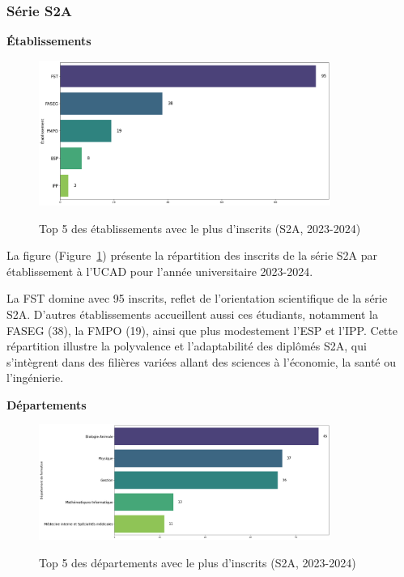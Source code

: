 
\subsubsection{Série S2A}

\textbf{Établissements}

\begin{figure}[ht]
\centering
\caption{Top 5 des établissements avec le plus d'inscrits (S2A, 2023-2024)}
\includegraphics[width=0.85\textwidth]{figure/etab_S2A_2024.png}
\label{fig:etab_s2a_2024}
\end{figure}

La figure (Figure~\ref{fig:etab_s2a_2024}) présente la répartition des inscrits de la série S2A par établissement à l'UCAD pour l'année universitaire 2023-2024.

La FST domine avec 95 inscrits, reflet de l’orientation scientifique de la série S2A. 
D’autres établissements accueillent aussi ces étudiants, notamment la FASEG (38), la FMPO (19), ainsi que plus modestement l’ESP et l’IPP. Cette répartition illustre la polyvalence et l’adaptabilité des diplômés S2A, qui s’intègrent dans des filières variées allant des sciences à l’économie, la santé ou l’ingénierie.

\textbf{Départements}

\begin{figure}[ht]
\centering
\caption{Top 5 des départements avec le plus d'inscrits (S2A, 2023-2024)}
\includegraphics[width=0.85\textwidth]{figure/dep_S2A_2024.png}
\label{fig:dep_s2a_2024}
\end{figure}

